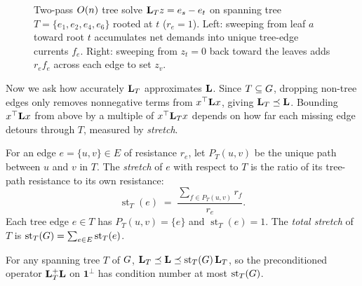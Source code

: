 \begin{figure}[htbp]
\caption{Two-pass $O(n)$ tree solve $\mathbf{L}_T z = e_s - e_t$ on spanning tree $T = \{e_1,e_2,e_4,e_6\}$ rooted at $t$ ($r_e = 1$). Left: sweeping from leaf $a$ toward root $t$ accumulates net demands into unique tree-edge currents $f_e$. Right: sweeping from $z_t = 0$ back toward the leaves adds $r_e f_e$ across each edge to set $z_v$.}
\label{ch41:fig-tree-solve}
\end{figure}

Now we ask how accurately $\mathbf{L}_T$ approximates $\mathbf{L}$. Since $T\subseteq G$, dropping non-tree edges only removes nonnegative terms from $x^\top \mathbf{L} x$, giving $\mathbf{L}_T\preceq\mathbf{L}$. Bounding $x^\top \mathbf{L} x$ from above by a multiple of $x^\top \mathbf{L}_T x$ depends on how far each missing edge detours through $T$, measured by \emph{stretch}.

\begin{definition}[Stretch]\label{ch41:def-stretch}
For an edge $e=\{u,v\} \in E$ of resistance $r_e$, let $P_T(u,v)$ be the unique path between $u$ and $v$ in $T$. The \emph{stretch} of $e$ with respect to $T$ is the ratio of its tree-path resistance to its own resistance:
\[
  \operatorname{st}_T(e) \;=\; \frac{\sum_{f\in P_T(u,v)} r_f}{r_e} .
\]
Each tree edge $e \in T$ has $P_T(u,v) = \{e\}$ and $\operatorname{st}_T(e) = 1$. The \emph{total stretch} of $T$ is $\operatorname{st}_T(G) = \sum_{e\in E}\operatorname{st}_T(e)$.
\end{definition}

\begin{lemma}\label{ch41:lem-stretch}
For any spanning tree $T$ of $G$, $\mathbf{L}_T\preceq\mathbf{L}\preceq \operatorname{st}_T(G)\,\mathbf{L}_T$, so the preconditioned operator $\mathbf{L}_T^{+}\mathbf{L}$ on $\mathbf{1}^\perp$ has condition number at most $\operatorname{st}_T(G)$.
\end{lemma}

